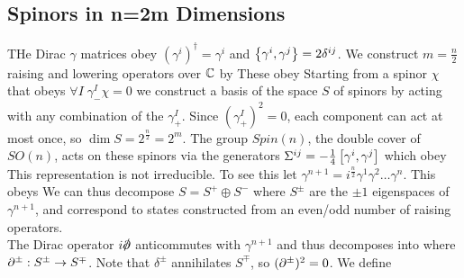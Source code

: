 \documentclass{article}
\begin{document}
\subsection{Spinors in n=2m Dimensions}
THe Dirac $\gamma$ matrices obey $(\gamma^i)^\dagger = \gamma^i$ and $\acomm[\gamma^i]{\gamma^j} = 2\delta^{ij}$. We construct $m= \frac{n}{2}$ raising and lowering operators over $\mbb{C}$ by 
These obey 
Starting from a spinor $\chi$ that obeys $\forall I \; \gamma_-^I \chi = 0$ we construct a basis of the space $S$ of spinors by acting with any combination of the $\gamma_+^I$. Since $(\gamma_+^I)^2 = 0$, each component can act at most once, so $\dim S = 2^{\frac{n}{2}} = 2^m$. The group $Spin(n)$, the double cover of $SO(n)$, acts on these spinors via the generators $\Sigma^{ij} = -\frac{1}{4} \comm[\gamma^i]{\gamma^j}$ which obey 
\eq{
\comm[\Sigma^{ij}]{\Sigma^{kl}} = i \left( \delta^{ik} \Sigma^{jl} + \delta^{jl}\Sigma^{ik} - \delta^{jk} \Sigma^{il} - \delta^{il} \Sigma^{jk} \right]
}
This representation is not irreducible. To see this let $\gamma^{n+1} = i^{\frac{n}{2}} \gamma^1 \gamma^2 \dots \gamma^n$. This obeys 
We can thus decompose $S = S^+ \oplus S^-$ where $S^\pm$ are the $\pm1$ eigenspaces of $\gamma^{n+1}$, and correspond to states constructed from an even/odd number of raising operators.  \\
The Dirac operator $i \slashed{\del} $ anticommutes with $\gamma^{n+1}$ and thus decomposes into 
where $\del^\pm : S^\pm \to S^\mp$. Note that $\delta^\pm$ annihilates $S^\mp$, so $(\del^\pm)^2 = 0$. We define 

\end{document}
